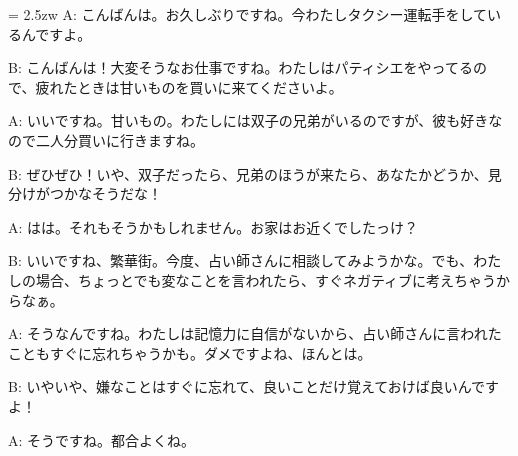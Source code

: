 \documentclass[11pt]{amsart}
\title{}
\author{}
\newenvironment{hangall}[1]{\hangindent = 2.5zw\everypar{\hangindent = 2.5zw}}{}
\begin{document}
\maketitle
\begin{hangall}{}%
A: こんばんは。お久しぶりですね。今わたしタクシー運転手をしているんですよ。



B: こんばんは！大変そうなお仕事ですね。わたしはパティシエをやってるので、疲れたときは甘いものを買いに来てくださいよ。



A: いいですね。甘いもの。わたしには双子の兄弟がいるのですが、彼も好きなので二人分買いに行きますね。



B: ぜひぜひ！いや、双子だったら、兄弟のほうが来たら、あなたかどうか、見分けがつかなそうだな！



A: はは。それもそうかもしれません。お家はお近くでしたっけ？



B: いいですね、繁華街。今度、占い師さんに相談してみようかな。でも、わたしの場合、ちょっとでも変なことを言われたら、すぐネガティブに考えちゃうからなぁ。



A: そうなんですね。わたしは記憶力に自信がないから、占い師さんに言われたこともすぐに忘れちゃうかも。ダメですよね、ほんとは。



B: いやいや、嫌なことはすぐに忘れて、良いことだけ覚えておけば良いんですよ！



A: そうですね。都合よくね。\end{hangall}
\end{document}
